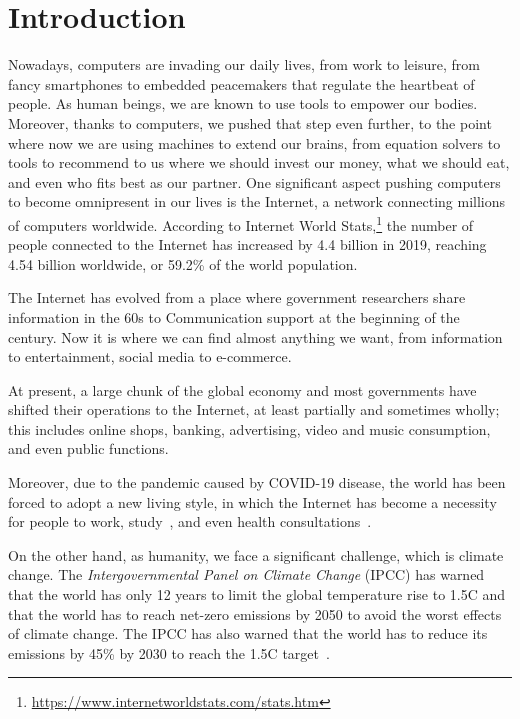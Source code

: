 \chapter{Introduction}
\label{chapter:introduction}

Nowadays, computers are invading our daily lives, from work to leisure, from fancy smartphones to embedded peacemakers that regulate the heartbeat of people.
As human beings, we are known to use tools to empower our bodies.
Moreover, thanks to computers, we pushed that step even further, to the point where now we are using machines to extend our brains, from equation solvers to tools to recommend to us where we should invest our money, what we should eat, and even who fits best as our partner.
One significant aspect pushing computers to become omnipresent in our lives is the Internet, a network connecting millions of computers worldwide.
According to Internet World Stats,\footnote{\url{https://www.internetworldstats.com/stats.htm}} the number of people connected to the Internet has increased by 4.4 billion in 2019, reaching 4.54 billion worldwide, or 59.2\% of the world population.

The Internet has evolved from a place where government researchers share information in the 60s to Communication support at the beginning of the century. Now it is where we can find almost anything we want, from information to entertainment, social media to e-commerce.

At present, a large chunk of the global economy and most governments have shifted their operations to the Internet, at least partially and sometimes wholly; this includes online shops, banking, advertising, video and music consumption, and even public functions.

Moreover, due to the pandemic caused by COVID-19 disease, the world has been forced to adopt a new living style, in which the Internet has become a necessity for people to work, study~\cite{naresh2020education}, and even health consultations~\cite{liaw2021primary}.

On the other hand, as humanity, we face a significant challenge, which is climate change.
The \emph{Intergovernmental Panel on Climate Change} (IPCC) has warned that the world has only 12 years to limit the global temperature rise to 1.5\degree C and that the world has to reach net-zero emissions by 2050 to avoid the worst effects of climate change.
The IPCC has also warned that the world has to reduce its emissions by 45\% by 2030 to reach the 1.5\degree C target~\cite{portner2022climate}.

